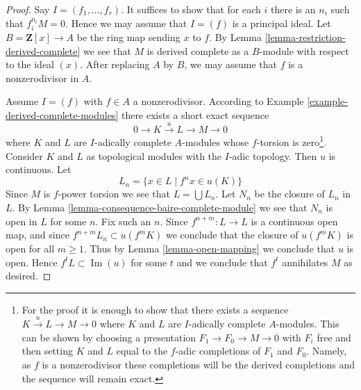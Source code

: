 \documentclass[10pt,a4paper]{amsart}
\theoremstyle{plain}
\theoremstyle{definition}
\theoremstyle{remark}
\numberwithin{equation}{subsection}
\def\Im{\mathop{\mathrm{Im}}}
\begin{document}
\begin{proof}
Say $I = (f_1, \ldots, f_r)$. It suffices to show
that for each $i$ there is an $n_i$ such that $f_i^{n_i}M = 0$.
Hence we may assume that $I = (f)$ is a principal ideal.
Let $B = \mathbf{Z}[x] \to A$ be the ring map sending $x$ to $f$.
By Lemma \ref{lemma-restriction-derived-complete}
we see that $M$ is derived complete as a $B$-module
with respect to the ideal $(x)$. After replacing $A$ by
$B$, we may assume that $f$ is a nonzerodivisor in $A$.

\medskip\noindent
Assume $I = (f)$ with $f \in A$ a nonzerodivisor.
According to Example \ref{example-derived-complete-modules}
there exists a short exact sequence
$$
0 \to K \xrightarrow{u} L \to M \to 0
$$
where $K$ and $L$ are $I$-adically complete $A$-modules
whose $f$-torsion is zero\footnote{For the proof it is enough
to show that there exists a sequence $K \xrightarrow{u} L \to M \to 0$
where $K$ and $L$ are $I$-adically complete $A$-modules. This can
be shown by choosing a presentation $F_1 \to F_0 \to M \to 0$
with $F_i$ free and then setting $K$ and $L$ equal to the
$f$-adic completions of $F_1$ and $F_0$. Namely, as $f$
is a nonzerodivisor these completions will be the
derived completions and the sequence will remain exact.}.
Consider $K$ and $L$ as
topological modules with the $I$-adic topology. Then $u$ is continuous.
Let
$$
L_n = \{x \in L \mid f^n x \in u(K)\}
$$
Since $M$ is $f$-power torsion we see that
$L = \bigcup L_n$. Let $N_n$ be the closure of $L_n$ in $L$.
By Lemma \ref{lemma-consequence-baire-complete-module}
we see that $N_n$ is open in $L$ for some $n$. Fix such an $n$.
Since $f^{n + m} : L \to L$ is a continuous open map, and since
$f^{n + m} L_n \subset u(f^m K)$ we conclude that
the closure of $u(f^mK)$ is open for all $m \geq 1$.
Thus by Lemma \ref{lemma-open-mapping}
we conclude that $u$ is open. Hence $f^tL \subset \Im(u)$
for some $t$ and we conclude that $f^t$ annihilates $M$
as desired.
\end{proof}
\end{document}
